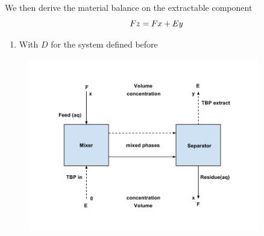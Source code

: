 \documentclass[aspectratio=1610,pdftex,dvipsnames,compress,xcolor={dvipsnames}]{beamer}
\begin{document}
\begin{frame}{We then derive the material balance on the extractable component}
    \begin{equation}
        \LARGE
        Fz = Fx + Ey
    \end{equation}
    
    \vspace*{\fill}

    \begin{enumerate}[topsep=0pt,itemsep=18pt,leftmargin=*,label=(\arabic*)]
        \item[]With $D$ for the system defined before
    \end{enumerate}
\end{frame}


\begin{frame}{}
    \begin{figure}
        \centering
        \includegraphics[width=0.90\textwidth]{single.stage.jpg}
    \end{figure}
\end{frame}
\end{document}
